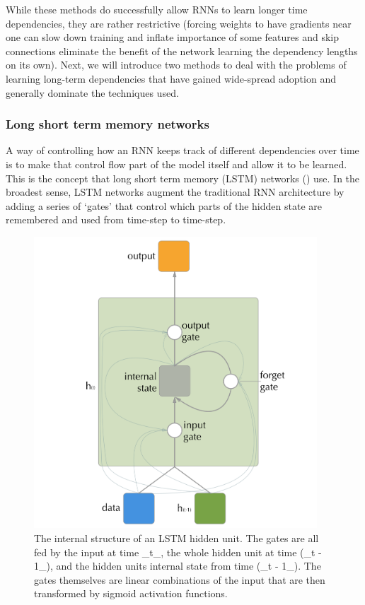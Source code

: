 \documentclass[]{book}
\theoremstyle{definition}
\theoremstyle{definition}
\theoremstyle{definition}
\theoremstyle{remark}
\begin{document}
While these methods do successfully allow RNNs to learn longer time
dependencies, they are rather restrictive (forcing weights to have
gradients near one can slow down training and inflate importance of some
features and skip connections eliminate the benefit of the network
learning the dependency lengths on its own). Next, we will introduce two
methods to deal with the problems of learning long-term dependencies
that have gained wide-spread adoption and generally dominate the
techniques used.

\subsubsection{Long short term memory
networks}\label{long-short-term-memory-networks}

A way of controlling how an RNN keeps track of different dependencies
over time is to make that control flow part of the model itself and
allow it to be learned. This is the concept that long short term memory
(LSTM) networks (\citet{lstm_intro}) use. In the broadest sense, LSTM
networks augment the traditional RNN architecture by adding a series of
`gates' that control which parts of the hidden state are remembered and
used from time-step to time-step.

\begin{figure}
\includegraphics[width=400]{figures/lstm_cell} \caption{The internal structure of an LSTM hidden unit. The gates are all fed by the input at time _t_, the whole hidden unit at time (_t - 1_), and the hidden units internal state from time (_t - 1_). The gates themselves are linear combinations of the input that are then transformed by sigmoid activation functions.}\label{fig:lstmdiagram}
\end{figure}
\end{document}
